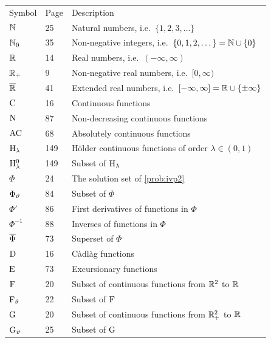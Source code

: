 \begin{table}[ht]
    \begin{center}
        \begin{tabular}{ l l l }
         Symbol & Page & Description\vspace*{4mm} \\
         $\mathbb{N}$ & 25 & Natural numbers, i.e.~$\{1,2,3,\dots\}$ \\
         $\mathbb{N}_0$ & 35 & Non-negative integers, i.e.~$\{0,1,2,\dots\}=\mathbb{N}\cup\{0\}$ \\
         $\mathbb{R}$ & 14 & Real numbers, i.e.~$(-\infty, \infty)$ \\
         $\mathbb{R}_+$ & 9 & Non-negative real numbers, i.e.~$[0,\infty)$ \\
         ${\overline{\mathbb{R}}}$ & 41 & Extended real numbers, i.e.~$[-\infty,\infty]=\mathbb{R}\cup\{\pm\infty\}$ \\
         $\mathrm{C}$ & 16 & Continuous functions \\
         $\mathrm{N}$ & 87 & Non-decreasing continuous functions \\
         $\mathrm{AC}$ & 68 & Absolutely continuous functions \\
         $\mathrm{H}_\lambda$ & 149 & H\"older continuous functions of order $\lambda\in(0,1)$ \\
         $\mathrm{H}_\lambda^0$ & 149 & Subset of $\mathrm{H}_\lambda$ \\
         $\Phi$ & 24 & The solution set of \autoref{prob:ivp2} \\
         $\Phi_\vartheta$ & 84 & Subset of $\Phi$ \\
         $\Phi'$ & 86 & First derivatives of functions in $\Phi$ \\
         $\Phi^{-1}$ & 88 & Inverses of functions in $\Phi$\\
         $\overline{\Phi}$ & 73 & Superset of $\Phi$ \\
         $\mathrm{D}$ & 16 & C\`adl\`ag functions \\
         $\mathrm{E}$ & 73 & Excursionary functions \\
         $\mathrm{F}$ & 20 & Subset of continuous functions from $\mathbb{R}^2$ to $\mathbb{R}$ \\
         $\mathrm{F}_\vartheta$ & 22 & Subset of $\mathrm{F}$ \\
         $\mathrm{G}$ & 20 & Subset of continuous functions from $\mathbb{R}_+^2$ to $\mathbb{R}$ \\
         $\mathrm{G}_\vartheta$ & 25 & Subset of $\mathrm{G}$
        \end{tabular}
    \end{center}
    \vspace*{-10mm}
\end{table}
